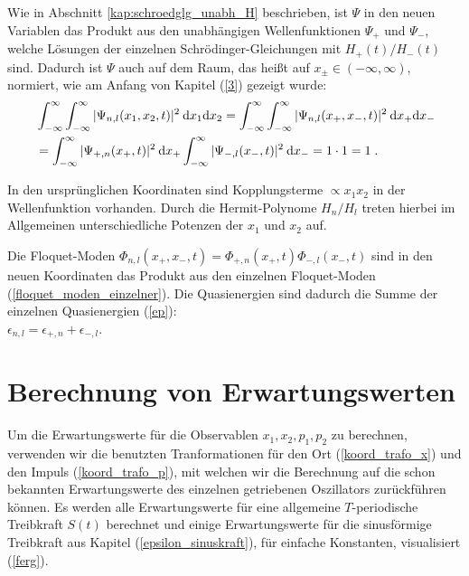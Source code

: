   Wie in Abschnitt \ref{kap:schroedglg_unabh_H} beschrieben, ist $\Psi$ in den neuen Variablen das Produkt aus den unabhängigen Wellenfunktionen $\Psi_+$ und $\Psi_-$, welche Lösungen der einzelnen Schrödinger-Gleichungen mit $H_+(t)/H_-(t)$ sind. Dadurch ist $\Psi$ auch auf dem Raum, das heißt auf $x_\pm \in (-\infty,\infty)$, normiert, wie am Anfang von Kapitel (\ref{3}) gezeigt wurde:
  \begin{align}
    &\int_{-\infty}^{\infty}\int_{-\infty}^{\infty} |\Psi_{n,l}(x_1,x_2,t)|^2 \: \text dx_1\text dx_2
    =\int_{-\infty}^{\infty}\int_{-\infty}^{\infty} |\Psi_{n,l}(x_+,x_-,t)|^2 \: \text dx_+\text dx_- \notag\\
    &=\int_{-\infty}^{\infty} |\Psi_{+,n}(x_+,t)|^2 \: \text dx_+ \int_{-\infty}^{\infty} |\Psi_{-,l}(x_-,t)|^2 \: \text dx_-
    = 1 \cdot 1 = 1 \; .
    \label{norm_gekoppelt}
  \end{align}

  In den ursprünglichen Koordinaten sind Kopplungsterme $\propto x_1x_2$ in der Wellenfunktion vorhanden.
  Durch die Hermit-Polynome $H_n/H_l$ treten hierbei im Allgemeinen unterschiedliche Potenzen der $x_1$ und $x_2$ auf.

  Die Floquet-Moden $\Phi_{n,l}(x_+,x_-,t)=\Phi_{+,n}(x_+,t)\Phi_{-,l}(x_-,t)$ sind in den neuen Koordinaten das Produkt aus den einzelnen Floquet-Moden (\ref{floquet_moden_einzelner}).
  Die Quasienergien sind dadurch die Summe der einzelnen Quasienergien (\ref{ep}):\\ $\epsilon_{n,l}=\epsilon_{+,n}+\epsilon_{-,l}$.


\section{Berechnung von Erwartungswerten}
  \label{erwartungswerte_gekoppelt}
  Um die Erwartungswerte für die Observablen $x_1,x_2,p_1,p_2$ zu berechnen, verwenden wir die benutzten Tranformationen für den Ort (\ref{koord_trafo_x}) und den Impuls (\ref{koord_trafo_p}), mit welchen wir die Berechnung auf die schon bekannten Erwartungswerte des einzelnen getriebenen Oszillators zurückführen können.
  Es werden alle Erwartungswerte für eine allgemeine $T$-periodische Treibkraft $S(t)$ berechnet und einige Erwartungswerte für die sinusförmige Treibkraft aus Kapitel (\ref{epsilon_sinuskraft}), für einfache Konstanten, visualisiert (\ref{ferg}).

